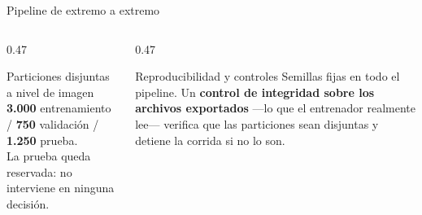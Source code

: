 \documentclass[aspectratio=169,11pt]{beamer}
\begin{document}
\begin{frame}{Pipeline de extremo a extremo}
  \vspace{0.7em}
  \begin{columns}[T]
    \begin{column}{0.47\textwidth}
      \begin{block}{Particiones disjuntas a nivel de imagen}
        \footnotesize
        \textbf{3.000} entrenamiento \enskip / \enskip \textbf{750} validación \enskip /
        \enskip \textbf{1.250} prueba.\\
        La prueba queda reservada: no interviene en ninguna decisión.
      \end{block}
    \end{column}
    \begin{column}{0.47\textwidth}
      \begin{exampleblock}{Reproducibilidad y controles}
        \footnotesize
        Semillas fijas en todo el pipeline. Un \textbf{control de integridad sobre los
        archivos exportados} ---lo que el entrenador realmente lee--- verifica que las
        particiones sean disjuntas y detiene la corrida si no lo son.
      \end{exampleblock}
    \end{column}
  \end{columns}
\end{frame}
\end{document}
